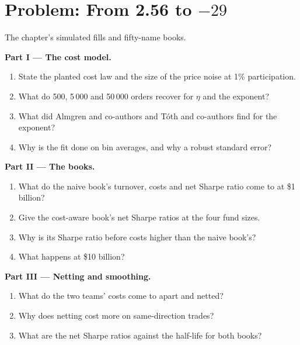 \section{Problem: From 2.56 to $-29$}

\begin{problem}\label{pb:rs:transaction-costs-in-research:1}
The chapter's simulated fills and fifty-name books.

\medskip\noindent\textbf{Part I --- The cost model.}
\begin{enumerate}
\item State the planted cost law and the size of the price noise at 1\% participation.
\item What do 500, 5\,000 and 50\,000 orders recover for $\eta$ and the exponent?
\item What did Almgren and co-authors and Tóth and co-authors find for the exponent?
\item Why is the fit done on bin averages, and why a robust standard error?
\end{enumerate}

\medskip\noindent\textbf{Part II --- The books.}
\begin{enumerate}[resume]
\item What do the naive book's turnover, costs and net Sharpe ratio come to at \$1 billion?
\item Give the cost-aware book's net Sharpe ratios at the four fund sizes.
\item Why is its Sharpe ratio before costs higher than the naive book's?
\item What happens at \$10 billion?
\end{enumerate}

\medskip\noindent\textbf{Part III --- Netting and smoothing.}
\begin{enumerate}[resume]
\item What do the two teams' costs come to apart and netted?
\item Why does netting cost more on same-direction trades?
\item What are the net Sharpe ratios against the half-life for both books?
\end{enumerate}


\end{problem}
